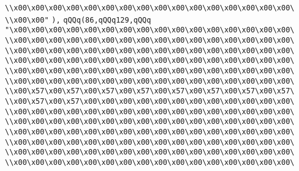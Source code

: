 \verb|\\x00\x00\x00\x00\x00\x00\x00\x00\x00\x00\x00\x00\x00\x00\x00\x00\|\newline
\verb|\\x00\x00"|\newline
\verb|),|\newline
\verb|qQQq(86,qQQq129,qQQq|\newline
\verb|"\x00\x00\x00\x00\x00\x00\x00\x00\x00\x00\x00\x00\x00\x00\x00\x00\|\newline
\verb|\\x00\x00\x00\x00\x00\x00\x00\x00\x00\x00\x00\x00\x00\x00\x00\x00\|\newline
\verb|\\x00\x00\x00\x00\x00\x00\x00\x00\x00\x00\x00\x00\x00\x00\x00\x00\|\newline
\verb|\\x00\x00\x00\x00\x00\x00\x00\x00\x00\x00\x00\x00\x00\x00\x00\x00\|\newline
\verb|\\x00\x00\x00\x00\x00\x00\x00\x00\x00\x00\x00\x00\x00\x00\x00\x00\|\newline
\verb|\\x00\x00\x00\x00\x00\x00\x00\x00\x00\x00\x00\x00\x00\x00\x00\x00\|\newline
\verb|\\x00\x57\x00\x57\x00\x57\x00\x57\x00\x57\x00\x57\x00\x57\x00\x57\|\newline
\verb|\\x00\x57\x00\x57\x00\x00\x00\x00\x00\x00\x00\x00\x00\x00\x00\x00\|\newline
\verb|\\x00\x00\x00\x00\x00\x00\x00\x00\x00\x00\x00\x00\x00\x00\x00\x00\|\newline
\verb|\\x00\x00\x00\x00\x00\x00\x00\x00\x00\x00\x00\x00\x00\x00\x00\x00\|\newline
\verb|\\x00\x00\x00\x00\x00\x00\x00\x00\x00\x00\x00\x00\x00\x00\x00\x00\|\newline
\verb|\\x00\x00\x00\x00\x00\x00\x00\x00\x00\x00\x00\x00\x00\x00\x00\x00\|\newline
\verb|\\x00\x00\x00\x00\x00\x00\x00\x00\x00\x00\x00\x00\x00\x00\x00\x00\|\newline
\verb|\\x00\x00\x00\x00\x00\x00\x00\x00\x00\x00\x00\x00\x00\x00\x00\x00\|\newline
